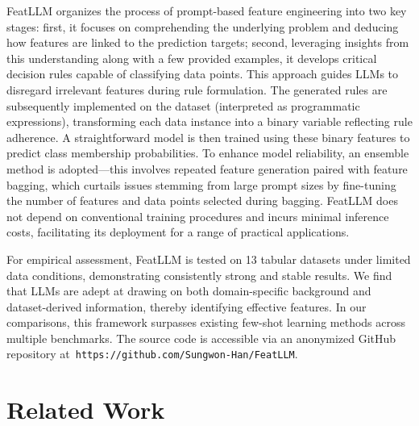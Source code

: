 \textsf{FeatLLM} organizes the process of prompt-based feature engineering into two key stages: first, it focuses on comprehending the underlying problem and deducing how features are linked to the prediction targets; second, leveraging insights from this understanding along with a few provided examples, it develops critical decision rules capable of classifying data points. This approach guides LLMs to disregard irrelevant features during rule formulation. The generated rules are subsequently implemented on the dataset (interpreted as programmatic expressions), transforming each data instance into a binary variable reflecting rule adherence. A straightforward model is then trained using these binary features to predict class membership probabilities. To enhance model reliability, an ensemble method is adopted—this involves repeated feature generation paired with feature bagging, which curtails issues stemming from large prompt sizes by fine-tuning the number of features and data points selected during bagging. \textsf{FeatLLM} does not depend on conventional training procedures and incurs minimal inference costs, facilitating its deployment for a range of practical applications.

For empirical assessment, \textsf{FeatLLM} is tested on 13 tabular datasets under limited data conditions, demonstrating consistently strong and stable results. We find that LLMs are adept at drawing on both domain-specific background and dataset-derived information, thereby identifying effective features. In our comparisons, this framework surpasses existing few-shot learning methods across multiple benchmarks. The source code is accessible via an anonymized GitHub repository at~\texttt{https://github.com/Sungwon-Han/FeatLLM}.

\section{Related Work}

